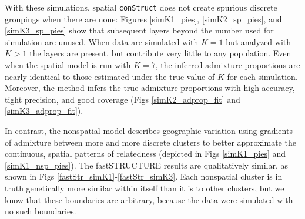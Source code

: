\documentclass[12pt]{article}
\begin{document}
% 
% 

With these simulations,
spatial \texttt{conStruct} does not create spurious discrete groupings when there are none:
Figures \ref{simK1_pies}, \ref{simK2_sp_pies}, and \ref{simK3_sp_pies} 
show that subsequent layers beyond the number used for simulation are unused.
When data are simulated with $K=1$ but analyzed with $K>1$ 
the layers are present, but contribute very little to any population.
Even when the spatial model is run with $K=7$, 
the inferred admixture proportions are nearly identical to 
those estimated under the true value of $K$ for each simulation.
Moreover, the method infers the true admixture proportions with high accuracy, tight precision, and good coverage 
(Figs \ref{simK2_adprop_fit} and \ref{simK3_adprop_fit}).

In contrast, the nonspatial model describes geographic variation
using gradients of admixture between more and more discrete clusters
to better approximate the continuous, spatial patterns of relatedness
(depicted in Figs \ref{simK1_pies} and \ref{simK1_nsp_pies}).
The fastSTRUCTURE results are qualitatively similar, as shown in Figs \ref{fastStr_simK1}-\ref{fastStr_simK3}.
Each nonspatial cluster is in truth genetically more similar within itself
than it is to other clusters,
but we know that these boundaries are arbitrary,
because the data were simulated with no such boundaries.
\end{document}
